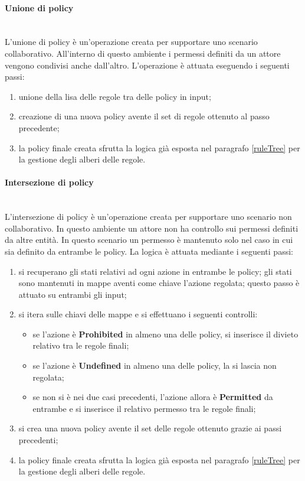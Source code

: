 \documentclass[12pt,a4paper,twoside]{book}
\begin{document}
\paragraph{Unione di policy}\mbox{}\\
L'unione di policy è un'operazione creata per supportare uno scenario collaborativo. All'interno di questo ambiente i permessi definiti da un attore vengono condivisi anche dall'altro. L'operazione è attuata eseguendo i seguenti passi:
\begin{enumerate}
\item unione della lisa delle regole tra delle policy in input;
\item creazione di una nuova policy avente il set di regole ottenuto al passo precedente;
\item la policy finale creata sfrutta la logica già esposta nel paragrafo \ref{ruleTree} per la gestione degli alberi delle regole.
\end{enumerate}
\paragraph{Intersezione di policy}\mbox{}\\
L'intersezione di policy è un'operazione creata per supportare uno scenario non collaborativo. In questo ambiente un attore non ha controllo sui permessi definiti da altre entità. In questo scenario un permesso è mantenuto solo nel caso in cui sia definito da entrambe le policy. La logica è attuata mediante i seguenti passi:
\begin{enumerate}
\item si recuperano gli stati relativi ad ogni azione in entrambe le policy; gli stati sono mantenuti in mappe aventi come chiave l'azione regolata; questo passo è attuato su entrambi gli input;
\item si itera sulle chiavi delle mappe e si effettuano i seguenti controlli:
\begin{itemize}
\item se l'azione è \textbf{Prohibited} in almeno una delle policy, si inserisce il divieto relativo tra le regole finali;
\item se l'azione è \textbf{Undefined} in almeno una delle policy, la si lascia non regolata;
\item se non si è nei due casi precedenti, l'azione allora è \textbf{Permitted} da entrambe e si inserisce il relativo permesso tra le regole finali;
\end{itemize}
\item si crea una nuova policy avente il set delle regole ottenuto grazie ai passi precedenti;
\item la policy finale creata sfrutta la logica già esposta nel paragrafo \ref{ruleTree} per la gestione degli alberi delle regole.
\end{enumerate}
\end{document}

